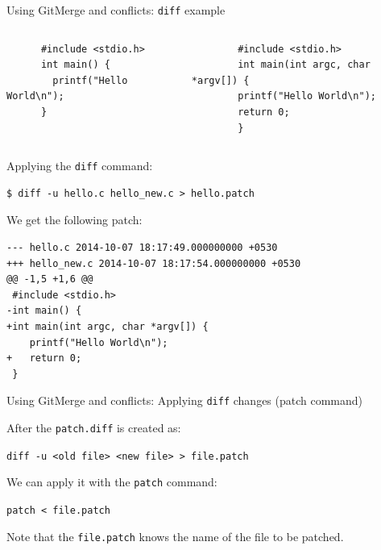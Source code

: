 \documentclass[10pt,compress]{beamer} %
\begin{document}
\begin{frame}[fragile]{Using Git}{Merge and conflicts: \texttt{diff} example}

\begin{scriptsize}
\begin{columns}
	  \begin{verbatim}
	  #include <stdio.h>
	  int main() {
	    printf("Hello World\n");
	  }
	  \end{verbatim}
	  \begin{verbatim}
	    #include <stdio.h>
	    int main(int argc, char *argv[]) {
	    printf("Hello World\n");
	    return 0;
	    }
	  \end{verbatim}
\end{columns}

Applying the \texttt{diff} command:
\begin{verbatim}
$ diff -u hello.c hello_new.c > hello.patch
\end{verbatim}

We get the following patch:
\begin{verbatim}
--- hello.c	2014-10-07 18:17:49.000000000 +0530
+++ hello_new.c	2014-10-07 18:17:54.000000000 +0530
@@ -1,5 +1,6 @@
 #include <stdio.h>
-int main() {
+int main(int argc, char *argv[]) {
 	printf("Hello World\n");
+	return 0;
 }
\end{verbatim}
\end{scriptsize}


\end{frame}


\begin{frame}{Using Git}{Merge and conflicts: Applying \texttt{diff} changes (patch command)}

After the \texttt{patch.diff} is created as:

\texttt{diff -u <old file> <new file> > file.patch }

We can apply it with the \texttt{patch} command:

\texttt{patch < file.patch}

Note that the \texttt{file.patch} knows the name of the file to be patched.


\end{frame}

\end{document}
